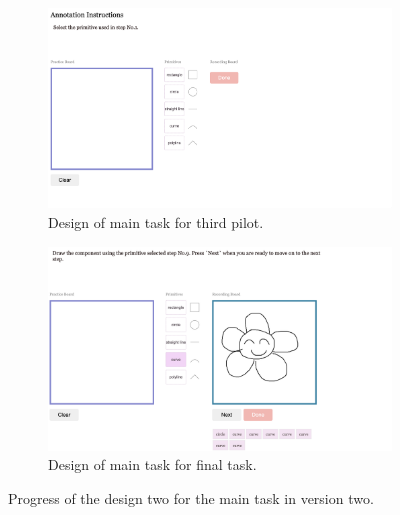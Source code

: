 \begin{figure}[h!]
\begin{subfigure}{\textwidth}
  \centering
  \includegraphics[width=.8\linewidth]{data_collection/version_0_select_primitive.png}
  \caption{Design of main task for third pilot.}
  \label{v0.1}
\end{subfigure}
\newline
\begin{subfigure}{\textwidth}
  \centering
  \includegraphics[width=.8\linewidth]{data_collection/version_0_smiley_flower_with_primitive.png}  
  \caption{Design of main task for final task.}
  \label{v0.1}
\end{subfigure}
\caption{Progress of the design two for the main task in version two.}
\label{v0.design}
\end{figure}
